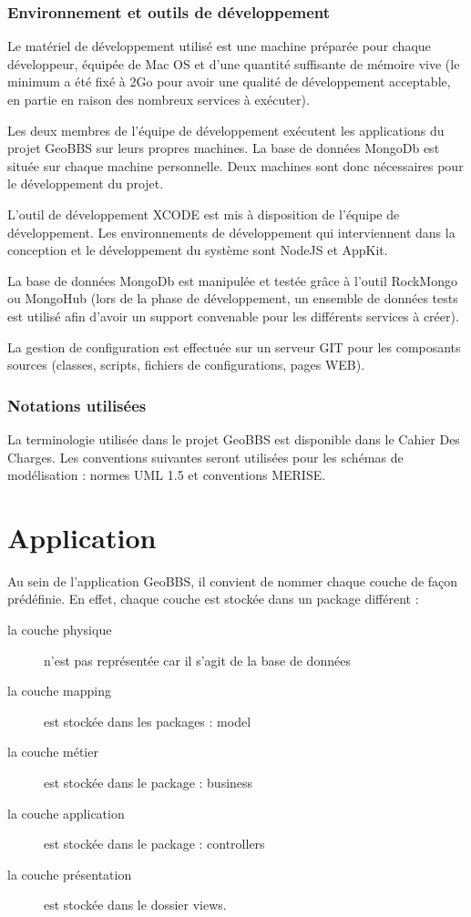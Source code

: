 \documentclass[a4paper,12pt]{report}
\begin{document}
\begin{onehalfspace}
\subsection{Environnement et outils de développement}
  Le matériel de développement utilisé est une machine préparée pour chaque développeur, équipée de  Mac OS et d’une quantité suffisante de mémoire vive (le minimum a été fixé à 2Go pour avoir une qualité de développement acceptable, en partie en raison des nombreux services à exécuter).

  Les deux membres de l’équipe de développement exécutent les applications du projet GeoBBS sur leurs propres machines. La base de données MongoDb est située sur chaque machine personnelle. Deux machines sont donc nécessaires pour le développement du projet.

  L’outil de développement XCODE est mis à disposition de l’équipe de développement. Les environnements de développement qui interviennent dans la conception et le développement du système sont NodeJS et AppKit.

  La base de données MongoDb est manipulée et testée grâce à l’outil RockMongo ou MongoHub (lors de la phase de développement, un ensemble de données tests est utilisé afin d’avoir un support convenable pour les différents services à créer).

  La gestion de configuration est effectuée sur un serveur GIT pour les composants sources (classes, scripts, fichiers de configurations, pages WEB).

\subsection{Notations utilisées}
  La terminologie utilisée dans le projet GeoBBS est disponible dans le Cahier Des Charges. Les conventions suivantes seront utilisées pour les schémas de modélisation : normes UML 1.5 et conventions MERISE.

\chapter{Application}
Au sein de l’application GeoBBS, il convient de nommer chaque couche de façon prédéfinie. En effet, chaque couche est stockée dans un package différent :
\begin{description}
\item[la couche physique] n’est pas représentée car il s’agit de la base de données
\item[la couche mapping] est stockée dans les packages : model
\item[la couche métier] est stockée dans le package : business
\item[la couche application] est stockée dans le package : controllers
\item[la couche présentation] est stockée dans le dossier views.
\end{description}


\end{onehalfspace}
\end{document}
